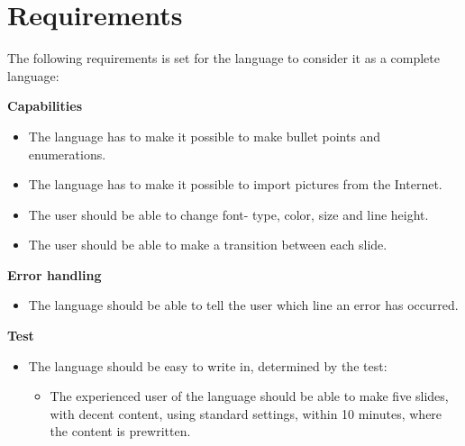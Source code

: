 \section{Requirements}
The following requirements is set for the language to consider it as a complete language:

\textbf{Capabilities}\\
\begin{itemize}
\item The language has to make it possible to make bullet points and enumerations.
\item The language has to make it possible to import pictures from the Internet.
\item The user should be able to change font- type, color, size and line height.
\item The user should be able to make a transition between each slide. 
\end{itemize}
\textbf{Error handling}\\
\begin{itemize}
\item The language should be able to tell the user which line an error has occurred. 
\end{itemize}
\textbf{Test}\\
\begin{itemize}
\item The language should be easy to write in, determined by the test:
\begin{itemize}
\item The experienced user of the language should be able to make five slides, with decent content, using standard settings, within 10 minutes, where the content is prewritten.
\end{itemize}
\end{itemize}